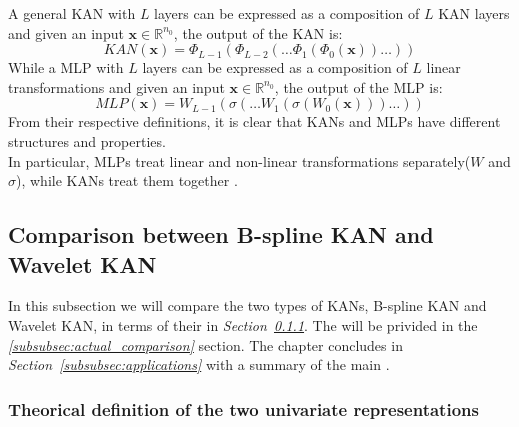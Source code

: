 \documentclass[11pt,a4paper,twocolumn]{article}
\begin{document}
    A general KAN with $L$ layers can be expressed as a composition of $L$ KAN layers and given an input $\bm{x}\in \mathbb{R}^{n_0}$, the output of the KAN is:
    \begin{equation}
        \label{eq:KAN_composition}
        KAN(\bm{x}) = \Phi_{L-1}(\Phi_{L-2}(\ldots \Phi_1(\Phi_0(\bm{x}))\ldots))
    \end{equation}
    While a MLP with $L$ layers can be expressed as a composition of $L$ linear transformations and given an input $\bm{x}\in \mathbb{R}^{n_0}$, the output of the MLP is:
    \begin{equation}
        \label{eq:MLP_composition}
        MLP(\bm{x}) = W_{L-1}(\sigma(\ldots W_1(\sigma(W_0(\bm{x})))\ldots))
    \end{equation}
    From their respective definitions, it is clear that KANs and MLPs have different structures and properties.
    \\
    In particular, MLPs treat linear and non-linear transformations separately($W$ and $\sigma$), while KANs treat them together \cite{liu2025kankolmogorovarnoldnetworks}.
    
    
    \subsection{Comparison between B-spline KAN and Wavelet KAN}
    \label{subsec:typeComparison}
    In this subsection we will compare the two types of KANs, B-spline KAN and Wavelet KAN, in terms of their \textit{} in \textit{Section~\ref{subsubsec:theorical_def_types}}.
    The \textit{} will be privided in the \textit{\ref{subsubsec:actual_comparison}} section.
    The chapter concludes in \textit{Section~\ref{subsubsec:applications}} with a summary of the main \textit{}.
    \subsubsection{Theorical definition of the two univariate representations}
    \label{subsubsec:theorical_def_types}
\end{document}
